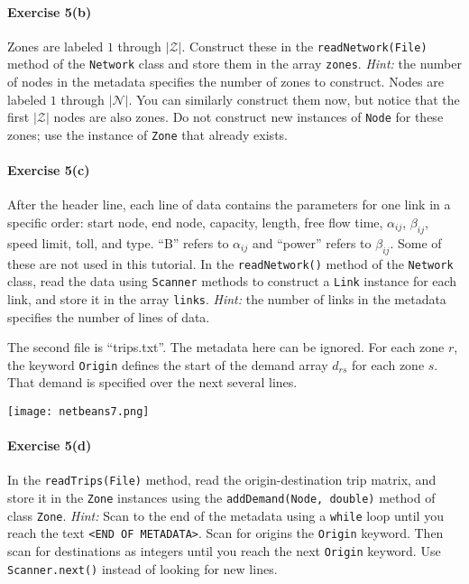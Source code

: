 \documentclass[12pt]{article}
\newcommand{\N}{\mathcal{N}}
\newcommand{\Z}{\mathcal{Z}}
\begin{document}
\vspace{\baselineskip}

\paragraph*{Exercise 5(b)} \noindent Zones are labeled $1$ through $\vert \Z \vert$. Construct these in the  \texttt{readNetwork(File)} method of the \texttt{Network} class and store them in the array \texttt{zones}. \textit{Hint:} the number of nodes in the metadata specifies the number of zones to construct.
Nodes are labeled $1$ through $\vert \N \vert$. You can similarly construct them now, but notice that the first $\vert \Z \vert$ nodes are also zones. Do not construct new instances of \texttt{Node} for these zones; use the instance of \texttt{Zone} that already exists. 

\paragraph*{Exercise 5(c)} After the header line, each line of data contains the parameters for one link in a specific order: start node, end node, capacity, length, free flow time, $\alpha_{ij}$, $\beta_{ij}$, speed limit, toll, and type. ``B'' refers to $\alpha_{ij}$ and ``power'' refers to $\beta_{ij}$. Some of these are not used in this tutorial. In the \texttt{readNetwork()} method of the \texttt{Network} class, read the data using \texttt{Scanner} methods to construct a \texttt{Link} instance for each link, and store it in the array \texttt{links}. \textit{Hint:} the number of links in the metadata specifies the number of lines of data. 


\vspace{\baselineskip}

\noindent
The second file is ``trips.txt''. The metadata here can be ignored. For each zone $r$, the keyword \texttt{Origin} defines the start of the demand array $d_{rs}$ for each zone $s$. That demand is specified over the next several lines.

\begin{center}
	\texttt{[image: netbeans7.png]}
\end{center}

\paragraph*{Exercise 5(d)} In the \texttt{readTrips(File)} method, read the origin-destination trip matrix, and store it in the \texttt{Zone} instances using the \texttt{addDemand(Node, double)} method of class \texttt{Zone}. \textit{Hint:} Scan to the end of the metadata using a \texttt{while} loop until you reach the text \texttt{<END OF METADATA>}. Scan for origins the \texttt{Origin} keyword. Then scan for destinations as integers until you reach the next \texttt{Origin} keyword. Use \texttt{Scanner.next()} instead of looking for new lines. 
\end{document}
